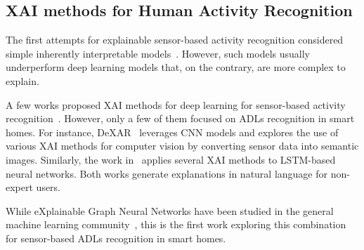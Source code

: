 \subsection{XAI methods for Human Activity Recognition}

The first attempts for explainable sensor-based activity recognition considered simple inherently interpretable models~\cite{bettini2021explainable,atzmueller2018explicative,guesgen2020using,khodabandehloo2021healthxai}. However, such models usually underperform deep learning models that, on the contrary, are more complex to explain.

A few works proposed XAI methods for deep learning for sensor-based activity recognition~\cite{jeyakumar2023x,meena2023explainable}. However, only a few of them focused on ADLs recognition in smart homes.
For instance, DeXAR~\cite{arrotta2022dexar} leverages CNN models and explores the use of various XAI methods for computer vision by converting sensor data into semantic images.
Similarly, the work in~\cite{das2023explainable} applies several XAI methods to LSTM-based neural networks. Both works generate explanations in natural language for non-expert users.

While eXplainable Graph Neural Networks have been studied in the general machine learning community~\cite{agarwal2023evaluating}, this is the first work exploring this combination for sensor-based ADLs recognition in smart homes.